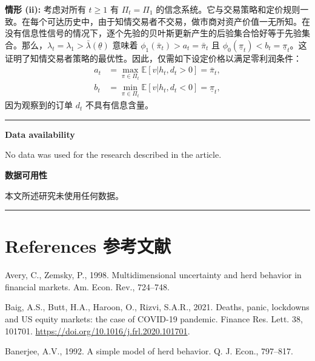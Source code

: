 \documentclass[12pt,a4paper]{article}
\newenvironment{original}{%
  \par\vspace{4pt}\noindent%
  \color{black}%
  \ignorespaces
}{%
  \par\vspace{2pt}%
}
\newenvironment{translation}{%
  \par\vspace{2pt}\noindent%
  \color{transblue}%
  \ignorespaces
}{%
  \par\vspace{4pt}\hrule\vspace{6pt}%
}
\newenvironment{biblock}{%
  \par\vspace{2pt}\noindent\small%
  \ignorespaces
}{%
  \par\vspace{2pt}%
}
\begin{document}
\begin{translation}
\textbf{情形 (ii):} 考虑对所有 $t \geq 1$ 有 $\Pi_t = \Pi_1$ 的信念系统。它与交易策略和定价规则一致。在每个可达历史中，由于知情交易者不交易，做市商对资产价值一无所知。在没有信息性信号的情况下，逐个先验的贝叶斯更新产生的后验集合恰好等于先验集合。那么，$\lambda_t = \lambda_1 > \bar{\lambda}(\underline{\theta})$ 意味着 $\phi_1(\bar{\pi}_t) > a_t = \bar{\pi}_t$ 且 $\phi_0(\underline{\pi}_t) < b_t = \underline{\pi}_t$。这证明了知情交易者策略的最优性。因此，仅需如下设定价格以满足零利润条件：
\begin{align*}
a_t &= \max_{\pi\in\Pi_t} \mathbb{E}[v|h_t, d_t > 0] = \bar{\pi}_t,\\
b_t &= \min_{\pi\in\Pi_t} \mathbb{E}[v|h_t, d_t < 0] = \underline{\pi}_t,
\end{align*}
因为观察到的订单 $d_t$ 不具有信息含量。
\end{translation}

\vspace{12pt}
\begin{original}
\noindent\textbf{Data availability}

No data was used for the research described in the article.
\end{original}
\begin{translation}
\textbf{数据可用性}

本文所述研究未使用任何数据。
\end{translation}

\newpage

\section*{References \hfill 参考文献}

\begin{biblock}
Avery, C., Zemsky, P., 1998. Multidimensional uncertainty and herd behavior in financial markets. Am. Econ. Rev., 724--748.
\end{biblock}

\begin{biblock}
Baig, A.S., Butt, H.A., Haroon, O., Rizvi, S.A.R., 2021. Deaths, panic, lockdowns and US equity markets: the case of COVID-19 pandemic. Finance Res. Lett. 38, 101701. \url{https://doi.org/10.1016/j.frl.2020.101701}.
\end{biblock}

\begin{biblock}
Banerjee, A.V., 1992. A simple model of herd behavior. Q. J. Econ., 797--817.
\end{biblock}
\end{document}
